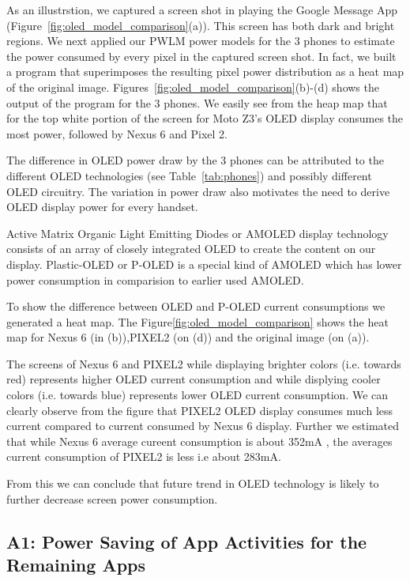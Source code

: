 As an illustrstion, we captured a screen shot in playing the Google
Message App (Figure~\ref{fig:oled_model_comparison}(a)). This screen
has both dark and bright regions. We next applied our PWLM power
models for the 3 phones to estimate the power consumed by every
pixel in the captured screen shot. In fact, we built a program that
superimposes the resulting pixel power distribution as a heat map of the
original image.  Figures~\ref{fig:oled_model_comparison}(b)-(d) shows
the output of the program for the 3 phones.  We easily see from the heap map that for
the top white portion of the screen for Moto Z3's OLED display consumes
the most power, followed by Nexus 6 and Pixel 2.

The difference in OLED power draw by the 3 phones can be
attributed to the different OLED technologies (see
Table~\ref{tab:phones}) and possibly different
OLED circuitry. The variation in power draw also motivates the need to
derive OLED display power for every handset.
\fi

Active Matrix Organic Light Emitting Diodes or AMOLED display
technology consists of an array of closely integrated OLED to create
the content on our display.  Plastic-OLED or P-OLED is a special kind
of AMOLED which has lower power consumption in comparision to earlier
used AMOLED.

To show the difference between OLED and P-OLED current consumptions we 
generated a heat map. The Figure\ref{fig:oled_model_comparison} shows
the heat map for Nexus 6 (in (b)),PIXEL2 (on (d)) and the original image (on (a)).

The screens of Nexus 6 and PIXEL2 while displaying brighter colors
(i.e. towards red) represents higher OLED current consumption and while
displying cooler colors (i.e. towards blue) represents lower OLED current
consumption. We can clearly observe from the figure that PIXEL2 OLED
display consumes much less current compared to current consumed by
Nexus 6 display. Further we estimated that while Nexus 6 average
cureent consumption is  about 352mA , the averages current consumption
of PIXEL2 is less i.e about 283mA.

From this we can conclude that future trend in OLED technology is
likely to further decrease screen power consumption.


\fi

\subsection*{A1: Power Saving of App Activities for the Remaining Apps}

